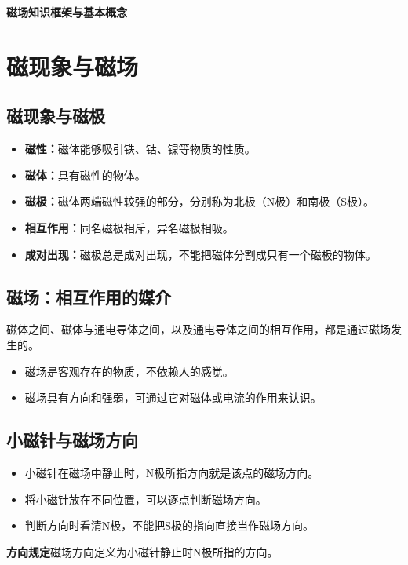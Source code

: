 \documentclass[a4paper,12pt,twoside]{article}
\begin{document}
\begin{center}
    {\Large\bfseries\color{navy}磁场知识框架与基本概念}
\end{center}
\tableofcontents
\cleardoublepage

\section{磁现象与磁场}

\subsection{磁现象与磁极}
\begin{itemize}
    \item \textbf{磁性：}磁体能够吸引铁、钴、镍等物质的性质。
    \item \textbf{磁体：}具有磁性的物体。
    \item \textbf{磁极：}磁体两端磁性较强的部分，分别称为北极（N极）和南极（S极）。
    \item \textbf{相互作用：}同名磁极相斥，异名磁极相吸。
    \item \textbf{成对出现：}磁极总是成对出现，不能把磁体分割成只有一个磁极的物体。
\end{itemize}

\subsection{磁场：相互作用的媒介}
磁体之间、磁体与通电导体之间，以及通电导体之间的相互作用，都是通过磁场发生的。
\begin{itemize}
    \item 磁场是客观存在的物质，不依赖人的感觉。
    \item 磁场具有方向和强弱，可通过它对磁体或电流的作用来认识。
\end{itemize}

\subsection{小磁针与磁场方向}
\begin{itemize}
    \item 小磁针在磁场中静止时，N极所指方向就是该点的磁场方向。
    \item 将小磁针放在不同位置，可以逐点判断磁场方向。
    \item 判断方向时看清N极，不能把S极的指向直接当作磁场方向。
\end{itemize}
\begin{formal}
    \noindent\textbf{方向规定}\quad 磁场方向定义为小磁针静止时N极所指的方向。
\end{formal}
\end{document}
